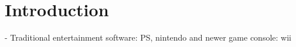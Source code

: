 \section{Introduction}\label{sec:intro}

\TODO
- Traditional entertainment software: PS, nintendo and newer game console: wii
